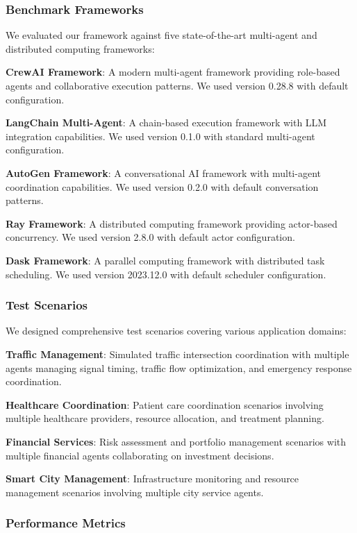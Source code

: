 \documentclass[conference]{IEEEtran}
\begin{document}
\subsubsection{Benchmark Frameworks}

We evaluated our framework against five state-of-the-art multi-agent and distributed computing frameworks:

\textbf{CrewAI Framework}: A modern multi-agent framework providing role-based agents and collaborative execution patterns. We used version 0.28.8 with default configuration.

\textbf{LangChain Multi-Agent}: A chain-based execution framework with LLM integration capabilities. We used version 0.1.0 with standard multi-agent configuration.

\textbf{AutoGen Framework}: A conversational AI framework with multi-agent coordination capabilities. We used version 0.2.0 with default conversation patterns.

\textbf{Ray Framework}: A distributed computing framework providing actor-based concurrency. We used version 2.8.0 with default actor configuration.

\textbf{Dask Framework}: A parallel computing framework with distributed task scheduling. We used version 2023.12.0 with default scheduler configuration.

\subsubsection{Test Scenarios}

We designed comprehensive test scenarios covering various application domains:

\textbf{Traffic Management}: Simulated traffic intersection coordination with multiple agents managing signal timing, traffic flow optimization, and emergency response coordination.

\textbf{Healthcare Coordination}: Patient care coordination scenarios involving multiple healthcare providers, resource allocation, and treatment planning.

\textbf{Financial Services}: Risk assessment and portfolio management scenarios with multiple financial agents collaborating on investment decisions.

\textbf{Smart City Management}: Infrastructure monitoring and resource management scenarios involving multiple city service agents.

\subsubsection{Performance Metrics}
\end{document}
